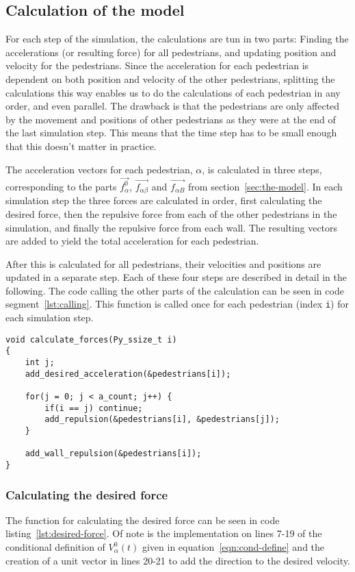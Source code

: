 \subsection{Calculation of the model}
For each step of the simulation, the calculations are tun in two parts: 
Finding the accelerations (or resulting force) for all pedestrians, and updating 
position and velocity for the pedestrians.  Since the acceleration for each pedestrian 
is dependent on both position and velocity of the other pedestrians, splitting the 
calculations this way enables us to do the calculations of each pedestrian in any 
order, and even parallel. The drawback is that the pedestrians are only affected by 
the movement and positions of other pedestrians as they were at the end of the last 
simulation step. This means that the time step has to be small enough that 
this doesn't matter in practice.

The acceleration vectors for each pedestrian, $\alpha$, is calculated in three 
steps, corresponding to the parts $\overrightarrow{f_\alpha^0}$, 
$\overrightarrow{f_{\alpha \beta}}$ and $\overrightarrow{f_{\alpha B}}$ from 
section~\ref{sec:the-model}. In each simulation step the three forces are 
calculated in order, first calculating the desired force, then the repulsive 
force from each of the other pedestrians in the simulation, and finally the 
repulsive force from each wall. The resulting vectors are added to yield the 
total acceleration for each pedestrian.

After this is calculated for all pedestrians, their velocities and positions are 
updated in a separate step. Each of these four steps are described in detail 
in the following. The code calling the other parts of the calculation can be 
seen in code segment~\ref{lst:calling}. This function is called once for each 
pedestrian (index \texttt{i}) for each simulation step.

\begin{lstlisting}[caption={Main function calling the other parts of the 
    calculation code.},label=lst:calling]
void calculate_forces(Py_ssize_t i)
{
    int j;
    add_desired_acceleration(&pedestrians[i]);

    for(j = 0; j < a_count; j++) {
        if(i == j) continue;
        add_repulsion(&pedestrians[i], &pedestrians[j]);
    }

    add_wall_repulsion(&pedestrians[i]);
}
\end{lstlisting}

\subsubsection{Calculating the desired force}
The function for calculating the desired force can be seen in code 
listing~\ref{lst:desired-force}. Of note is the implementation on lines 7-19 
of the conditional definition of $V_\alpha^0(t)$ given in 
equation~\eqref{eqn:cond-define} and the creation of a unit vector in lines 
20-21 to add the direction to the desired velocity.

